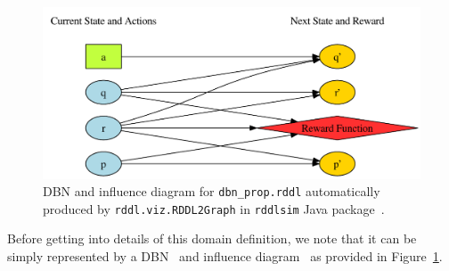 \documentclass[11pt,a4paper]{article}
\begin{document}
\begin{figure}[t!]
\begin{center}
\includegraphics[scale=.6]{dbn_prop.pdf}
\caption{DBN and influence diagram 
for \texttt{dbn\_prop.rddl} automatically
produced by \texttt{rddl.viz.RDDL2Graph} in \texttt{rddlsim} Java 
package~\cite{rddlsim}.}
\label{fig:rddl1}
\end{center}
\end{figure}

Before getting into details of this domain definition, we note
that it can be simply represented by a DBN~\cite{dbn} and 
influence diagram~\cite{influence_diagrams}
as provided in Figure~\ref{fig:rddl1}.
\end{document}
